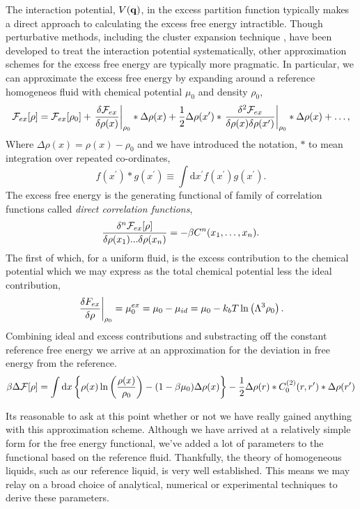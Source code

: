The interaction potential, $V(\mathbf{q})$, in the excess partition function typically
makes a direct approach to calculating the excess free energy intractible.
Though perturbative methods, including the cluster expansion technique
\cite{MAYER41}, have been developed to treat the interaction potential
systematically, other approximation schemes for the excess free energy are
typically more pragmatic.  In particular, we can approximate the excess free
energy by expanding around a reference homogeneos fluid with chemical potential
$\mu_0$ and density $\rho_0$,
%
\begin{equation} \mathcal{F}_{ex}[\rho] = \mathcal{F}_{ex}[\rho_0] + \left . \frac{\delta \mathcal{F}_{ex}}{\delta
    \rho(x)} \right\vert_{\rho_0} \ast \Delta\rho(x) + \frac{1}{2}
    \Delta\rho(x^\prime) \ast \left . \frac{\delta^2 \mathcal{F}_{ex}}{\delta\rho(x)\delta\rho(x^\prime)}
    \right\vert_{\rho_0} \ast \Delta\rho(x) + \dots, \end{equation}
%
Where $\Delta\rho(x) = \rho(x) - \rho_0$ and we have introduced the notation,
$\ast$ to mean integration over repeated co-ordinates,
%
\begin{equation} f(x^\prime) \ast g(x^\prime) \equiv \int\mathrm{d}x^\prime
f(x^\prime) g(x^\prime).  \end{equation}
%
The excess free energy is the generating functional of family of correlation
functions called \textit{direct correlation functions}, 
%
\begin{equation} \frac{\delta^n \mathcal{F}_{ex}[\rho]}{\delta \rho(x_1) ... \delta \rho(x_n)} = -\beta
C^{n}(x_1, \dots, x_n).  \end{equation}
%
The first of which, for a uniform fluid, is the excess contribution to the
chemical potential which we may express as the total chemical potential less
the ideal contribution, 
%
\begin{equation} \left.\frac{\delta F_{ex}}{\delta \rho}\right\vert_{\rho_0} = \mu_0^{ex}
= \mu_0 - \mu_{id} = \mu_0 - k_bT\ln\left(\Lambda^3 \rho_0\right).
\end{equation}
%
Combining ideal and excess contributions and substracting off the constant
reference free energy we arrive at an approximation for the deviation in free
energy from the reference. 
%
\begin{equation} \label{cdft_free_energy} \beta \Delta \mathcal{F} [\rho] = \int
    \mathrm{d}x \left\lbrace \rho(x) \ln\left(\frac{\rho(x)}{\rho_0} \right) -(1-\beta\mu_0)
    \Delta \rho(x)\right\rbrace - \frac{1}{2}\Delta \rho(r) \ast C_0^{(2)}(r,
    r^\prime) \ast \Delta \rho(r^\prime) \end{equation}

Its reasonable to ask at this point whether or not we have really gained
anything with this approximation scheme.  Although we have arrived at a
relatively simple form for the free energy functional, we've added a lot of
parameters to the functional based on the reference fluid.  Thankfully, the
theory of homogeneous liquids, such as our reference liquid, is very well
established.  This means we may relay on a broad choice of analytical,
numerical or experimental techniques to derive these parameters.
